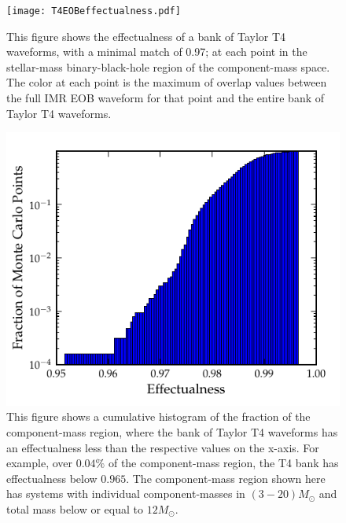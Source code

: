 \documentclass[aps,
prd,
amsmath,
amssymb,
twocolumn,
floatfix,
groupedaddress]{revtex4-1}
\begin{document}
\begin{figure}
\centering
\texttt{[image: T4EOBeffectualness.pdf]}
\caption{\label{fig:match_t4eob_all}This figure shows the effectualness of a bank of Taylor T4 waveforms, with a minimal match of 0.97; at each point in the stellar-mass binary-black-hole region of the component-mass space. The color at each point is the maximum of overlap values between the full IMR EOB waveform for that point and the entire bank of Taylor T4 waveforms.}
\end{figure}
\begin{figure}
\centering
\includegraphics[scale=0.04, clip=false, totalheight=0.3\textheight, width=\columnwidth]{T4EOBhist.pdf}
\caption{\label{fig:cumhist_t4eob_cut10}This figure shows a cumulative histogram of the fraction of the component-mass region, where the bank of Taylor T4 waveforms has an effectualness less than the respective values on the x-axis. For example, over $0.04\%$ of the component-mass region, the T4 bank has effectualness below $0.965$. The component-mass region shown here has systems with individual component-masses in $(3-20)M_{\odot}$ and total mass below or equal to $12M_{\odot}$.}
\end{figure}
\end{document}
